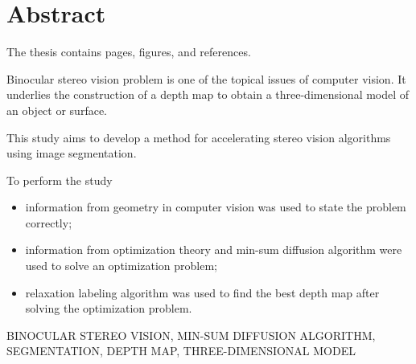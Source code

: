 \chapter*{Abstract}

The thesis contains \pageref{LastPage} pages,
 figures, and
 references.

Binocular stereo vision problem is one of the topical issues
of computer vision.
It underlies the construction of a depth map to obtain a three-dimensional model
of an object or surface.

This study aims to develop a method
for accelerating stereo vision algorithms using image segmentation.

To perform the study
\begin{itemize}
  \item information from geometry
        in computer vision was used to state the problem correctly;
  \item information from optimization theory and
        min-sum diffusion algorithm were used to solve an optimization problem;
  \item relaxation labeling algorithm was used to find the best depth map after
        solving the optimization problem.
\end{itemize}

\MakeUppercase{binocular stereo vision,
               min-sum diffusion algorithm,
               segmentation,
               depth map,
               three-dimensional model}

